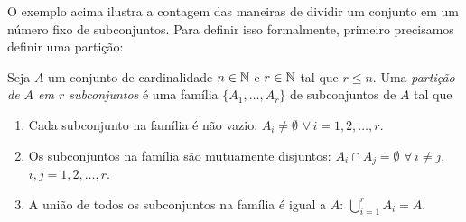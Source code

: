 O exemplo acima ilustra a contagem das maneiras de dividir um conjunto em um número fixo de subconjuntos. Para definir isso formalmente, primeiro precisamos definir uma partição:

\begin{definition}
Seja $A$ um conjunto de cardinalidade $n\in \mathbb{N}$ e $r \in \mathbb{N}$ tal que $r \leq n$. Uma \emph{partição de $A$ em $r$ subconjuntos} é uma família $\{A_1, \dots, A_r\}$ de subconjuntos de $A$ tal que
\begin{enumerate}
\item Cada subconjunto na família é não vazio: $A_i \neq \emptyset$ $\forall \, i=1,2,\dots,r$.
\item Os subconjuntos na família são mutuamente disjuntos: $A_i \cap A_j = \emptyset $ $ \forall \, i \neq j$, $i,j=1,2,\dots,r$.
\item A união de todos os subconjuntos na família é igual a $A$:  $\bigcup_{i=1}^{r}A_i=A$.
\end{enumerate}
\end{definition}

